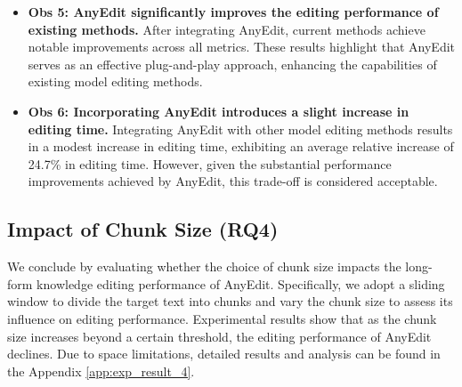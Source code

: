 \begin{itemize}[leftmargin=*]
    \item \textbf{Obs 5: AnyEdit significantly improves the editing performance of existing methods.}  
    After integrating AnyEdit, current methods achieve notable improvements across all metrics. These results highlight that AnyEdit serves as an effective plug-and-play approach, enhancing the capabilities of existing model editing methods.
    \item \textbf{Obs 6: Incorporating AnyEdit introduces a slight increase in editing time.}  
    Integrating AnyEdit with other model editing methods results in a modest increase in editing time, exhibiting an average relative increase of 24.7\% in editing time. However, given the substantial performance improvements achieved by AnyEdit, this trade-off is considered acceptable.
\end{itemize}


\subsection{Impact of Chunk Size (RQ4)} 
We conclude by evaluating whether the choice of chunk size impacts the long-form knowledge editing performance of AnyEdit. Specifically, we adopt a sliding window to divide the target text into chunks and vary the chunk size to assess its influence on editing performance. Experimental results show that as the chunk size increases beyond a certain threshold, the editing performance of AnyEdit declines. Due to space limitations, detailed results and analysis can be found in the Appendix \ref{app:exp_result_4}.


